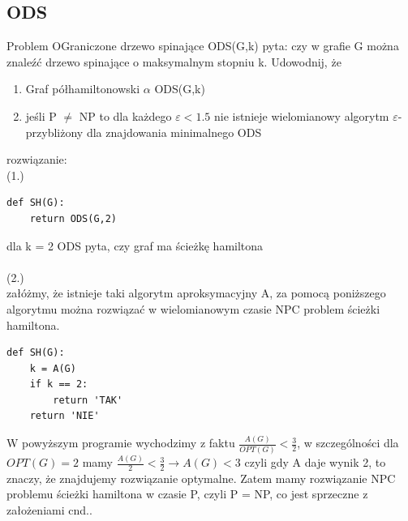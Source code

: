 \documentclass{article}
\begin{document}
\subsection*{ODS}
Problem OGraniczone drzewo spinające ODS(G,k) pyta: czy w grafie G można znaleźć drzewo spinające o maksymalnym stopniu k. Udowodnij, że 
\begin{enumerate}
	\item Graf półhamiltonowski $\alpha$ ODS(G,k)
	\item jeśli P $\ne$ NP to dla każdego $\varepsilon < 1.5$ nie istnieje wielomianowy algorytm $\varepsilon$-przybliżony dla znajdowania minimalnego ODS
\end{enumerate}
rozwiązanie:\\
(1.) 
\begin{lstlisting}
def SH(G):
	return ODS(G,2)
\end{lstlisting}
dla k = 2 ODS pyta, czy graf ma ścieżkę hamiltona \\\\
(2.) \\
załóżmy, że istnieje taki algorytm aproksymacyjny A, za pomocą poniższego algorytmu można rozwiązać w wielomianowym czasie NPC problem ścieżki hamiltona.
\begin{lstlisting}
def SH(G):
	k = A(G)
	if k == 2:
		return 'TAK'
	return 'NIE'
\end{lstlisting}
W powyższym programie wychodzimy z faktu $\frac{A(G)}{OPT(G)} < \frac{3}{2}$, w szczególności dla $OPT(G) = 2$ mamy 
$\frac{A(G)}{2} < \frac{3}{2} \rightarrow A(G) < 3$ czyli gdy A daje wynik 2, to znaczy, że znajdujemy rozwiązanie optymalne.
Zatem mamy rozwiązanie NPC problemu ścieżki hamiltona w czasie P, czyli P = NP, co jest sprzeczne z założeniami cnd.. 
\end{document}
